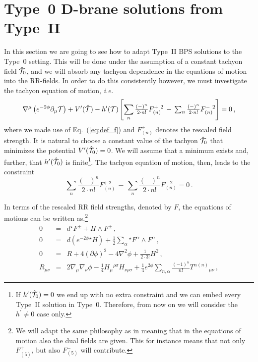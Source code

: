 \documentclass[12pt,a4paper]{article}
\begin{document}
\section{Type~0 D-brane solutions from Type~II}
In this section we are going to see how to adapt Type~II BPS solutions
to the Type~0 setting. This will be done under the assumption of a
constant tachyon field $\hat{\cal T}_{0}$, and we will absorb any
tachyon dependence in the equations of motion into the RR-fields.  In
order to do this consistently however, we must investigate the tachyon
equation of motion, {\em i.e.}
\begin{equation}
  \label{eq:tacheom}
  \nabla^{\mu}\left( e^{-2\phi}\partial_{\mu}\mathcal{T}\right) 
+V^{\prime}(\hat{\cal T})
    - h^{\prime}(\mathcal{T})\left[
          \sum_{n} \textstyle{\frac{(-)^{n}}{2\cdot n!}}F^{+\ 2}_{(n)}\,-\,
          \sum_{n} \textstyle{\frac{(-)^{n}}{2\cdot n!}}F^{-\ 2}_{(n)} 
     \right] =0\, ,
\end{equation}
where we made use of Eq.~(\ref{eq:def_f}) and $F^{\pm}_{(n)}$ denotes
the rescaled field strength.  It is natural to choose a constant value
of the tachyon $\hat{\cal T}_{0}$ that minimizes the potential
$V^{\prime}(\hat{\cal T}_{0})=0$. We will assume that a minimum exists
and, further, that $h^{\prime}(\hat{\cal T}_{0})$ is
finite\footnote{If $h^{\prime}(\hat{\cal T}_{0})=0$ we end up with no
  extra constraint and we can embed every Type~II solution in Type~0.
  Therefore, from now on we will consider the $h^{\prime}\neq 0$ case
  only.}. The tachyon equation of motion, then, leads to the
constraint
\begin{equation}
\label{eq:constraint}
  \sum_{n} \textstyle{\frac{(-)^{n}}{2\cdot n!}}F^{+\ 2}_{(n)}\,-\,
          \sum_{n} \textstyle{\frac{(-)^{n}}{2\cdot n!}}F^{-\ 2}_{(n)}=0\, . 
\end{equation}

In terms of the rescaled RR field strengths, denoted by $F$, the
equations of motions can be written as,\footnote{We will adapt the
  same philosophy as in \cite{kn:JMO} meaning that in the equations of
  motion also the dual fields are given. This for instance means that
  not only $F_{(5)}^{+}$, but also $F_{(5)}^{-}$ will contribute.}
\begin{eqnarray}
  \label{eq:0BEoM}
  0 &=& d{}^{\star}F^{\pm} +H\wedge F^{\pm}\, , \nonumber \\
  0 &=& d \left(e^{-2\phi} {}^{\star} H \right)
          +\frac{1}{2} \sum_{\alpha}
              {}^{\star} F^{\alpha} \wedge F^{\alpha}\, , \nonumber \\
  0&=& R +4\left(\partial\phi\right)^{2}  -4\nabla^{2}\phi
       +{\textstyle\frac{1}{2\cdot 3!}}H^{2}\, , \nonumber \\
  R_{\mu\nu}&=& 2\nabla_{\mu}\nabla_{\nu}\phi
          -{\textstyle\frac{1}{4}} H_{\mu}{}^{\rho\sigma} H_{\nu\rho\sigma}
          +{\textstyle\frac{1}{4}}e^{2\phi}\sum_{n,\alpha}
          {\textstyle\frac{(-1)^{n}}{n!}} T^{\alpha (n)}{}_{\mu\nu}\, ,
\end{eqnarray}
\end{document}
